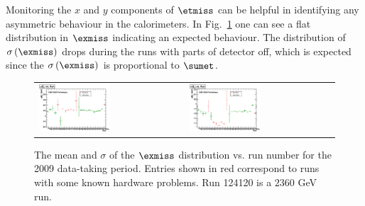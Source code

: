Monitoring the $x$ and $y$ components of $\etmiss$ can be helpful in
identifying any asymmetric behaviour in the
calorimeters. In Fig.~\ref{fig:MEx_vs_run} one can see a flat
distribution in $\exmiss$ indicating an expected behaviour. The
distribution of $\sigma\left(\exmiss\right)$ drops during the runs with parts of
detector off, which is expected since the $\sigma\left(\exmiss\right)$ is
proportional to $\sumet$. 

\begin{figure}[h!]
  \centering
  \begin{tabular}{ll}
    \includegraphics[width=0.5\textwidth]{plots_METStability/h_calometPxMean_vs_run.eps} &
    \includegraphics[width=0.5\textwidth]{plots_METStability/h_calometPxSigma_vs_run.eps} \\
  \end{tabular}
  \caption{\small The mean and $\sigma$ of the $\exmiss$ distribution
    vs. run number for the 2009 data-taking period.  Entries shown in
    red correspond to runs with some known hardware problems. Run 124120 is a $2360$ GeV run.\label{fig:MEx_vs_run}}
\end{figure}


